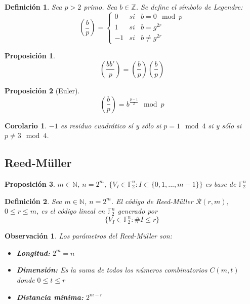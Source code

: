 \documentclass[spanish]{book}
\newtheorem{mydef}{Definición}
\newtheorem{obsv}{Observación}
\newtheorem{coro}{Corolario}
\newtheorem{proposi}{Proposición}
\begin{document}
\begin{mydef}
	Sea $p>2$ primo. Sea $b \in \mathbb{Z}$. Se define el símbolo de Legendre:
	$$\left( \frac{b}{p} \right)=\left\{\begin{array}{ccc}
	0 & si & b=0 \mod p \\
	1 & si & b=g^{2r} \\
	-1 & si & b \neq g^{2r}
	\end{array}
	\right.
	$$
\end{mydef}

\begin{proposi}
	$$\left(\frac{bb'}{p}\right)=\left(\frac{b}{p}\right)\left(\frac{b}{p}\right)$$
\end{proposi}

\begin{proposi}[Euler]
	$$\left(\frac{b}{p}\right)=b^{\displaystyle \frac{p-1}{2}} \mod p$$
\end{proposi}


\begin{coro}
	$-1$ es residuo cuadrático sí y sólo si $p=1 \mod 4$ si y sólo si $p\neq 3 \mod 4$.
\end{coro}

\subsection{Reed-Müller}
\begin{proposi}
	$m \in \mathbb{N}$, $n=2^m$, $\{ V_I \in \mathbb{F}_2^n: I \subset \{0, 1,..., m-1\}\}$ es base de $\mathbb{F}_2^n$
\end{proposi}


\begin{mydef}
	Sea $m \in \mathbb{N}$, $n=2^m$. El código de Reed-Müller $\mathcal{R}(r, m)$, $0\leq r \leq m$, es el código lineal en $\mathbb{F}_2^n$ generado por $$ \{ V_I \in \mathbb{F}_2^n: \# I \leq r \} $$
\end{mydef}

\begin{obsv}
	Los parámetros del Reed-Müller son:
	\begin{itemize}
		\item \textbf{Longitud: } $2^m=n$
		\item \textbf{Dimensión: } Es la suma de todos los números combinatorios $C(m, t)$ donde $0 \leq t \leq r$ 
		\item \textbf{Distancia mínima: } $2^{m-r}$
	\end{itemize}
\end{obsv}
\end{document}
